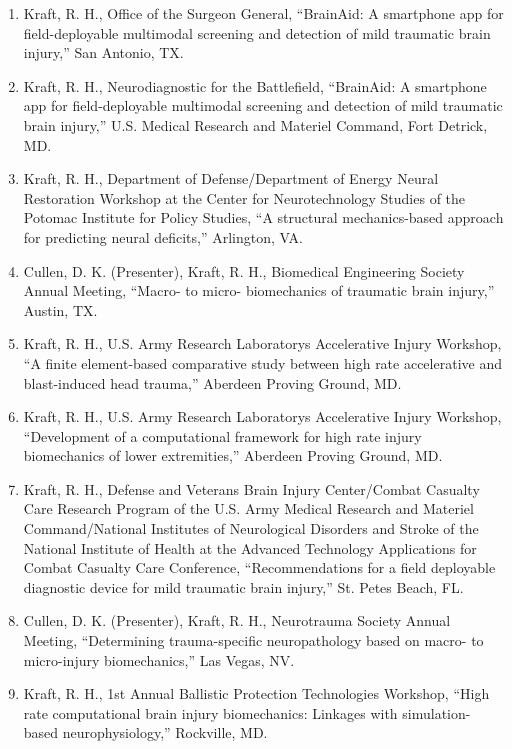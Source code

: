 \documentclass[11pt]{article}
\begin{document}
\begin{enumerate}
\item
  Kraft, R. 
H., Office of the Surgeon General, ``BrainAid: A smartphone
  app for field-deployable multimodal screening and detection of mild
  traumatic brain injury,'' San Antonio, TX.
\item
  Kraft, R. 
H., Neurodiagnostic for the Battlefield, ``BrainAid: A
  smartphone app for field-deployable multimodal screening and detection
  of mild traumatic brain injury,'' U.S. 
Medical Research and Materiel
  Command, Fort Detrick, MD.
\item
  Kraft, R. 
H., Department of Defense/Department of Energy Neural
  Restoration Workshop at the Center for Neurotechnology Studies of the
  Potomac Institute for Policy Studies, ``A structural mechanics-based
  approach for predicting neural deficits,'' Arlington, VA.
\item
  Cullen, D. 
K. 
(Presenter), Kraft, R. 
H., Biomedical Engineering
  Society Annual Meeting, ``Macro- to micro- biomechanics of traumatic
  brain injury,'' Austin, TX.
\item
  Kraft, R. 
H., U.S. 
Army Research Laboratory\textquotesingle s
  Accelerative Injury Workshop, ``A finite element-based comparative
  study between high rate accelerative and blast-induced head trauma,''
  Aberdeen Proving Ground, MD.
\item
  Kraft, R. 
H., U.S. 
Army Research Laboratory\textquotesingle s
  Accelerative Injury Workshop, ``Development of a computational
  framework for high rate injury biomechanics of lower extremities,''
  Aberdeen Proving Ground, MD.
\item
  Kraft, R. 
H., Defense and Veterans Brain Injury Center/Combat Casualty
  Care Research Program of the U.S. 
Army Medical Research and Materiel
  Command/National Institutes of Neurological Disorders and Stroke of
  the National Institute of Health at the Advanced Technology
  Applications for Combat Casualty Care Conference, ``Recommendations for
  a field deployable diagnostic device for mild traumatic brain injury,''
  St. 
Pete\textquotesingle s Beach, FL.
\item
  Cullen, D. 
K. 
(Presenter), Kraft, R. 
H., Neurotrauma Society Annual
  Meeting, ``Determining trauma-specific neuropathology based on macro-
  to micro-injury biomechanics,'' Las Vegas, NV.
\item
  Kraft, R. 
H., 1st Annual Ballistic Protection Technologies Workshop,
  ``High rate computational brain injury biomechanics: Linkages with
  simulation-based neurophysiology,'' Rockville, MD.

\end{enumerate}
\end{document}
